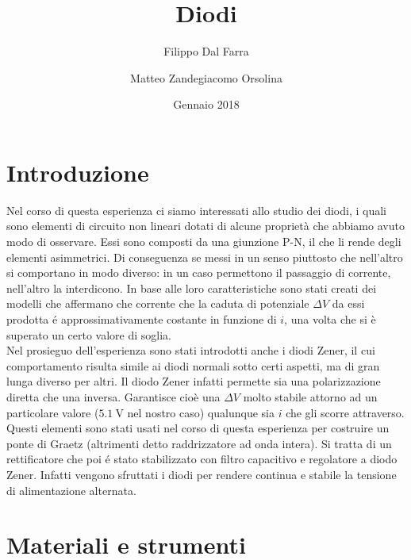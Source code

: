 \documentclass{article}
\title{Diodi}
\author{Filippo Dal Farra \and Matteo Zandegiacomo Orsolina}
\date{Gennaio 2018}
\begin{document}
\maketitle

\newpage

\section{Introduzione}

Nel corso di questa esperienza ci siamo interessati allo studio dei diodi, i quali sono elementi di circuito non lineari dotati di alcune proprietà che abbiamo avuto modo di osservare. Essi sono composti da una giunzione P-N, il che li rende degli elementi asimmetrici. Di conseguenza se messi in un senso piuttosto che nell'altro si comportano in modo diverso: in un caso permettono il passaggio di corrente, nell'altro la interdicono. 
In base alle loro caratteristiche sono stati creati dei modelli che affermano che corrente che la caduta di potenziale $\Delta V$ da essi prodotta \'e approssimativamente costante in funzione di $i$, una volta che si è superato un certo valore di soglia.\\ 

Nel prosieguo dell'esperienza sono stati introdotti anche i diodi Zener, il cui comportamento risulta simile ai diodi normali sotto certi aspetti, ma di gran lunga diverso per altri. Il diodo Zener infatti permette sia una polarizzazione diretta che una inversa. Garantisce cioè una $\Delta V$ molto stabile attorno ad un particolare valore ($5.1\ \si{\volt}$ nel nostro caso) qualunque sia $i$ che gli scorre attraverso. \\
Questi elementi sono stati usati nel corso di questa esperienza per costruire un ponte di Graetz (altrimenti detto raddrizzatore ad onda intera). Si tratta di un rettificatore che poi \'e stato stabilizzato con filtro capacitivo e regolatore a diodo Zener. Infatti vengono sfruttati i diodi per rendere continua e stabile la tensione di alimentazione alternata.

\section{Materiali e strumenti}
\end{document}
